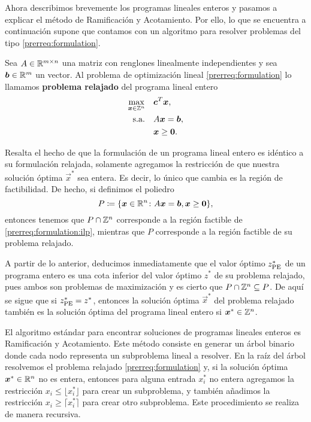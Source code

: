Ahora describimos brevemente los programas lineales enteros y pasamos a explicar el método de
Ramificación y Acotamiento. Por ello, lo que se encuentra a continuación supone que contamos con un
algoritmo para resolver problemas del tipo \eqref{prerreq:formulation}.
\begin{definition}
	Sea $A \in \mathbb{R}^{m \times n}$ una matriz con renglones linealmente independientes y sea $\boldsymbol{b}
	\in \mathbb{R}^m$ un vector. Al problema de optimización lineal \eqref{prerreq:formulation} lo llamamos
	\textbf{problema relajado} del programa lineal entero
	\begin{subequations}
		\label{prerreq:formulation:ilp}
		\begin{align}
			\max_{\boldsymbol{x} \in \mathbb{Z}^n} \quad
				& \boldsymbol{c}^T\boldsymbol{x}, \label{prerreq:formulation:objective:ilp} \\
			\text{s.a.} \quad
				& A\boldsymbol{x} = \boldsymbol{b}, \label{prerreq:formulation:constraints:ilp} \\
				& \boldsymbol{x} \geq \boldsymbol{0} \nonumber.
		\end{align}
	\end{subequations}
\end{definition}
Resalta el hecho de que la formulación de un programa lineal entero es idéntico a su formulación
relajada, solamente agregamos la restricción de que nuestra solución óptima $\vec{x}^*$
sea entera. Es decir, lo único que cambia es la región de factibilidad. De hecho, si
definimos el poliedro
\begin{equation*}
	P \coloneq \lbrace \boldsymbol{x} \in \mathbb{R}^n \colon A\boldsymbol{x} = \boldsymbol{b}, \boldsymbol{x} \geq \boldsymbol{0} \rbrace,
\end{equation*}
entonces tenemos que $P \cap \mathbb{Z}^n$ corresponde a la región factible de
\eqref{prerreq:formulation:ilp}, mientras que $P$ corresponde a la región factible de su problema
relajado.

A partir de lo anterior, deducimos inmediatamente que el valor óptimo $z^*_{\text{PE}}$ de un programa
entero es una cota inferior del valor óptimo $z^*$ de su problema relajado, pues ambos son problemas
de maximización y es cierto que $P \cap \mathbb{Z}^n \subseteq P$. De aquí se sigue que si $z^*_{\text{PE}} =
z^*$, entonces la solución óptima $\vec{x}^*$ del problema relajado también es la solución
óptima del programa lineal entero si $\boldsymbol{x}^* \in \mathbb{Z}^n$.

El algoritmo estándar para encontrar soluciones de programas lineales enteros es Ramificación y
Acotamiento. Este método consiste en generar un árbol binario donde cada nodo representa un
subproblema lineal a resolver. En la raíz del árbol resolvemos el problema relajado
\eqref{prerreq:formulation} y, si la solución óptima $\boldsymbol{x}^* \in \mathbb{R}^n$ no es entera, entonces
para alguna entrada $x_i^*$ no entera agregamos la restricción $x_i \leq \lfloor x_i^* \rfloor$ para
crear un subproblema, y también añadimos la restricción $x_i \geq \lceil x_i^* \rceil$ para crear
otro subproblema. Este procedimiento se realiza de manera recursiva.

